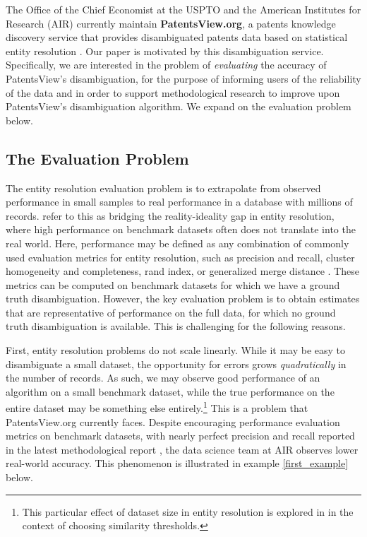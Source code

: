 \documentclass[fontsize=11pt]{article}
\theoremstyle{definition}
\begin{document}
The Office of the Chief Economist at the USPTO and the American Institutes for Research (AIR) currently maintain \textbf{PatentsView.org}, a patents knowledge discovery service that provides disambiguated patents data based on statistical entity resolution \citep{toole2021patentsview}. Our paper is motivated by this disambiguation service. Specifically, we are interested in the problem of \textit{evaluating} the accuracy of PatentsView's disambiguation, for the purpose of informing users of the reliability of the data and in order to support methodological research to improve upon PatentsView's disambiguation algorithm. We expand on the evaluation problem below.

\subsection{The Evaluation Problem}\label{sec:challenges}

The entity resolution evaluation problem is to extrapolate from observed performance in small samples to real performance in a database with millions of records. \cite{Wang2022} refer to this as bridging the reality-ideality gap in entity resolution, where high performance on benchmark datasets often does not translate into the real world. Here, performance may be defined as any combination of commonly used evaluation metrics for entity resolution, such as precision and recall, cluster homogeneity and completeness, rand index, or generalized merge distance \citep{Maidasani2012}. These metrics can be computed on benchmark datasets for which we have a ground truth disambiguation. However, the key evaluation problem is to obtain estimates that are representative of performance on the full data, for which no ground truth disambiguation is available. This is challenging for the following reasons.

First, entity resolution problems {do not scale linearly}. While it may be easy to disambiguate a small dataset, the opportunity for errors grows \textit{quadratically} in the number of records. As such, we may observe good performance of an algorithm on a small benchmark dataset, while the true performance on the entire dataset may be something else entirely.\footnote{This particular effect of dataset size in entity resolution is explored in \cite{Draisbach2013} in the context of choosing similarity thresholds.} This is a problem that PatentsView.org currently faces. Despite encouraging performance evaluation metrics on benchmark datasets, with nearly perfect precision and recall reported in the latest methodological report \citep{Monath2021}, the data science team at AIR observes lower real-world accuracy. {This phenomenon is illustrated in example \ref{first_example} below.}
\end{document}
